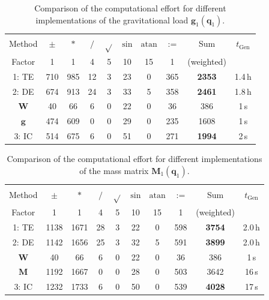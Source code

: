 \documentclass[twocolumn,10pt]{IFTOMM}
\newcommand{\bm}[1]{\boldsymbol{#1}}
\begin{document}
\begin{table}
    \caption{Comparison of the computational effort for different implementations of the gravitational load $\bm{g}_1(\bm{q}_1)$.}%
    \label{tab:computation_grav}
    \centering
    \setlength\tabcolsep{3pt}
    \small
    \begin{tabular}[t]{|c|c|c|c|c|c|c|c|c|c|} 
        \hline
        Method & $\pm$ & $*$ & $/$ & $\sqrt{}$ & $\mathrm{sin}$ & $\mathrm{atan}$ & $:=$ & Sum & $t_{\mathrm{Gen}}$ \\
        Factor & 1 & 1 & 4 & 5 & 10 & 15 & 1 & (weighted) & \\
        \hline
        \rowcolor{Gray}
        1: TE  & 710 & 985 & 12 & 3 & 23 & 0 & 365 & \textbf{2353} & 1.4\,h \\
        \rowcolor{Gray}
        2: DE & 674 & 913 & 24 & 3 & 33 & 5 & 358 & \textbf{2461} & 1.8\,h \\
        $\bm{W}$ & 40 & 66 & 6 & 0 & 22 & 0 & 36 & 386 & 1\,s \\
        $\bm{g}$ & 474 & 609 & 0 & 0 & 29 & 0 & 235 & 1608 & 1\,s \\
        \rowcolor{Gray}
        3: IC & 514 & 675 & 6 & 0 & 51 & 0 & 271 & \textbf{1994} & 2\,s \\
        \hline
    \end{tabular}
    \vspace{-0.2cm}
\end{table}
%
\begin{table}
    \caption{Comparison of the computational effort for different implementations of the mass matrix $\bm{M}_1(\bm{q}_1)$.}%
    \label{tab:computation_inertia}
    \centering
    \setlength\tabcolsep{3pt}
    \small
    \begin{tabular}[t]{|c|c|c|c|c|c|c|c|c|c|} 
        \hline
        Method & $\pm$ & $*$ & $/$ & $\sqrt{}$ & $\mathrm{sin}$ & $\mathrm{atan}$ & $:=$ & Sum & $t_{\mathrm{Gen}}$ \\
        Factor & 1 & 1 & 4 & 5 & 10 & 15 & 1 & (weighted) & \\
        \hline
        \rowcolor{Gray}
        1: TE  & 1138 & 1671 & 28 & 3 & 22 & 0 & 598 & \textbf{3754} & 2.0\,h \\
        \rowcolor{Gray}
        2: DE & 1142 & 1656 & 25 & 3 & 32 & 5 & 591 & \textbf{3899} & 2.0\,h \\
        $\bm{W}$ & 40 & 66 & 6 & 0 & 22 & 0 & 36 & 386 & 1\,s \\
        $\bm{M}$ & 1192 & 1667 & 0 & 0 & 28 & 0 & 503 & 3642 & 16\,s \\
        \rowcolor{Gray}
        3: IC & 1232 & 1733 & 6 & 0 & 50 & 0 & 539 & \textbf{4028} & 17\,s \\
        \hline
    \end{tabular}
    \vspace{-0.2cm}
\end{table}
%
\end{document}
